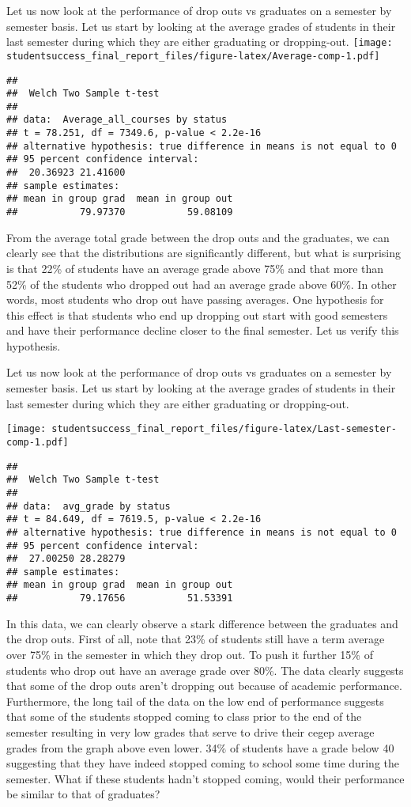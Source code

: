 \documentclass[]{book}
\theoremstyle{definition}
\theoremstyle{definition}
\theoremstyle{remark}
\begin{document}
Let us now look at the performance of drop outs vs graduates on a
semester by semester basis. Let us start by looking at the average
grades of students in their last semester during which they are either
graduating or dropping-out.
\texttt{[image: studentsuccess\_final\_report\_files/figure-latex/Average-comp-1.pdf]}

\begin{verbatim}
## 
##  Welch Two Sample t-test
## 
## data:  Average_all_courses by status
## t = 78.251, df = 7349.6, p-value < 2.2e-16
## alternative hypothesis: true difference in means is not equal to 0
## 95 percent confidence interval:
##  20.36923 21.41600
## sample estimates:
## mean in group grad  mean in group out 
##           79.97370           59.08109
\end{verbatim}

From the average total grade between the drop outs and the graduates, we
can clearly see that the distributions are significantly different, but
what is surprising is that 22\% of students have an average grade above
75\% and that more than 52\% of the students who dropped out had an
average grade above 60\%. In other words, most students who drop out
have passing averages. One hypothesis for this effect is that students
who end up dropping out start with good semesters and have their
performance decline closer to the final semester. Let us verify this
hypothesis.

Let us now look at the performance of drop outs vs graduates on a
semester by semester basis. Let us start by looking at the average
grades of students in their last semester during which they are either
graduating or dropping-out.

\texttt{[image: studentsuccess\_final\_report\_files/figure-latex/Last-semester-comp-1.pdf]}

\begin{verbatim}
## 
##  Welch Two Sample t-test
## 
## data:  avg_grade by status
## t = 84.649, df = 7619.5, p-value < 2.2e-16
## alternative hypothesis: true difference in means is not equal to 0
## 95 percent confidence interval:
##  27.00250 28.28279
## sample estimates:
## mean in group grad  mean in group out 
##           79.17656           51.53391
\end{verbatim}

In this data, we can clearly observe a stark difference between the
graduates and the drop outs. First of all, note that 23\% of students
still have a term average over 75\% in the semester in which they drop
out. To push it further 15\% of students who drop out have an average
grade over 80\%. The data clearly suggests that some of the drop outs
aren't dropping out because of academic performance. Furthermore, the
long tail of the data on the low end of performance suggests that some
of the students stopped coming to class prior to the end of the semester
resulting in very low grades that serve to drive their cegep average
grades from the graph above even lower. 34\% of students have a grade
below 40 suggesting that they have indeed stopped coming to school some
time during the semester. What if these students hadn't stopped coming,
would their performance be similar to that of graduates?
\end{document}
